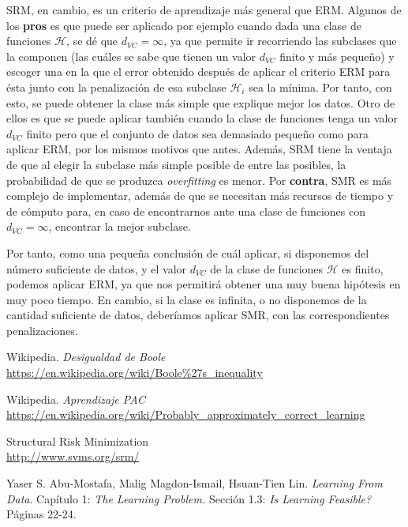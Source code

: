 \documentclass[11pt,a4paper]{article}
\begin{document}
SRM, en cambio, es un criterio de aprendizaje más general que ERM. Algunos de los \textbf{pros} es que puede ser aplicado
por ejemplo cuando dada una clase de funciones $\mathcal{H}$, se dé que $d_{VC} = \infty$, ya que permite ir recorriendo las
subclases que la componen (las cuáles se sabe que tienen un valor $d_{VC}$ finito y más pequeño) y escoger una en la que el
error obtenido después de aplicar el criterio ERM para ésta junto con la penalización de esa subclase $\mathcal{H}_i$ sea la
mínima. Por tanto, con esto, se puede obtener la clase más simple que explique mejor los datos. Otro de ellos es que se puede
aplicar también cuando la clase de funciones tenga un valor $d_{VC}$ finito pero que el conjunto de datos sea demasiado pequeño
como para aplicar ERM, por los mismos motivos que antes. Además, SRM tiene la ventaja de que al elegir la subclase más simple
posible de entre las posibles, la probabilidad de que se produzca \textit{overfitting} es menor. Por \textbf{contra}, SMR
es más complejo de implementar, además de que se necesitan más recursos de tiempo y de cómputo para, en caso de encontrarnos
ante una clase de funciones con $d_{VC} = \infty$, encontrar la mejor subclase.

Por tanto, como una pequeña conclusión de cuál aplicar, si disponemos del número suficiente de datos, y el valor $d_{VC}$ de
la clase de funciones $\mathcal{H}$ es finito, podemos aplicar ERM, ya que nos permitirá obtener una muy buena hipótesis
en muy poco tiempo. En cambio, si la clase es infinita, o no disponemos de la cantidad suficiente de datos, deberíamos aplicar
SMR, con las correspondientes penalizaciones.


\newpage

\begin{thebibliography}{5}

Wikipedia. \textit{Desigualdad de Boole}
\\\url{https://en.wikipedia.org/wiki/Boole\%27s_inequality}

Wikipedia. \textit{Aprendizaje PAC}
\\\url{https://en.wikipedia.org/wiki/Probably_approximately_correct_learning}

Structural Risk Minimization
\\\url{http://www.svms.org/srm/}

Yaser S. Abu-Mostafa, Malig Magdon-Ismail, Hsuan-Tien Lin. \textit{Learning From Data}. Capítulo 1: \textit{The Learning Problem.} Sección 1.3: \textit{Is Learning Feasible?} Páginas 22-24.

\end{thebibliography}
\end{document}
